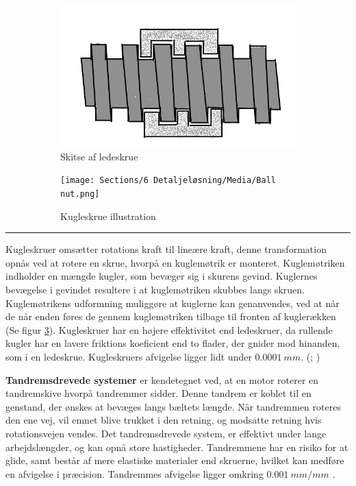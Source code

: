 \begin{figure}[H]
    \centering
    \begin{subfigure}[b]{0.49\textwidth}
    \centering
        \includegraphics[width=\linewidth]{Sections/5 Konceptgenerering/Media/Ledeskrue-skitse.png}
      \caption{Skitse af ledeskrue}
       \label{fig:Ledeskrue - skitse} %
  \end{subfigure}
    \hfill
  \begin{subfigure}[b]{0.49\textwidth}
    \centering
    \texttt{[image: Sections/6 Detaljeløsning/Media/Ball nut.png]}
    \caption{Kugleskrue illustration}
    \label{fig: Balls nut} %
  \end{subfigure}
    \caption{}
\end{figure} \plainbreak{-0.5}

Kugleskruer omsætter rotations kraft til lineære kraft, denne transformation opnås ved at rotere en skrue, hvorpå en kuglemøtrik er monteret. Kuglemøtriken indholder en mængde kugler, som bevæger sig i skurens gevind. Kuglernes bevægelse i gevindet resultere i at kuglemøtriken skubbes langs skruen. Kuglemøtrikens udformning muliggøre at kuglerne kan genanvendes, ved at når de når enden føres de gennem kuglemøtriken tilbage til fronten af kuglerækken (Se figur \ref{fig: Balls nut}). Kugleskruer har en højere effektivitet end ledeskruer, da rullende kugler har en lavere friktions koeficient end to flader, der gnider mod hinanden, som i en ledeskrue. Kugleskruers afvigelse ligger lidt under $\SI{0,0001}{mm}$. (\cite{Jaffe2025PrecisionGround}; \cite{IndustrialQuickSearch2025BallBenefits})


\textbf{Tandremsdrevede systemer} er kendetegnet ved, at en motor roterer en tandremskive hvorpå tandremmer sidder. Denne tandrem er koblet til en genstand, der ønskes at bevæges langs bæltets længde. Når tandremmen roteres den ene vej, vil emnet blive trukket i den retning, og modsatte retning hvis rotationsvejen vendes. Det tandremsdrevede system, er effektivt under lange arbejdslængder, og kan opnå store hastigheder. Tandremmene har en risiko for at glide, samt består af mere elastiske materialer end skruerne, hvilket kan medføre en afvigelse i præcision. Tandremmes afvigelse ligger omkring \(\SI{0,001}{mm/mm}\) \parencite{Rollco2022BallWhat}. 

